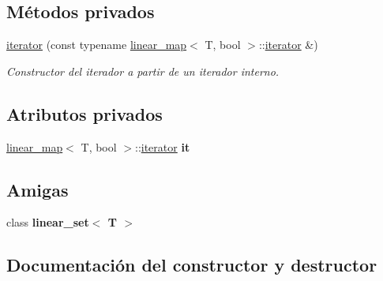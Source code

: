 \subsection*{Métodos privados}
\begin{DoxyCompactItemize}
\item 
\mbox{\label{classlinear__set_1_1iterator_a6778932b66a53ffd0efc46d26a0710c3}} 
\mbox{\hyperlink{classlinear__set_1_1iterator_a6778932b66a53ffd0efc46d26a0710c3}{iterator}} (const typename \mbox{\hyperlink{classlinear__map}{linear\+\_\+map}}$<$ T, bool $>$\+::\mbox{\hyperlink{classlinear__set_1_1iterator}{iterator}} \&)
\begin{DoxyCompactList}\small\item\em Constructor del iterador a partir de un iterador interno. \end{DoxyCompactList}\end{DoxyCompactItemize}
\subsection*{Atributos privados}
\begin{DoxyCompactItemize}
\item 
\mbox{\label{classlinear__set_1_1iterator_ae79df8b590ffcf8cd07a4751f859e882}} 
\mbox{\hyperlink{classlinear__map}{linear\+\_\+map}}$<$ T, bool $>$\+::\mbox{\hyperlink{classlinear__set_1_1iterator}{iterator}} {\bfseries it}
\end{DoxyCompactItemize}
\subsection*{Amigas}
\begin{DoxyCompactItemize}
\item 
\mbox{\label{classlinear__set_1_1iterator_a534ce5acb60190eb00d1f44365fa38b5}} 
class {\bfseries linear\+\_\+set$<$ T $>$}
\end{DoxyCompactItemize}


\subsection{Documentación del constructor y destructor}
\mbox{\label{classlinear__set_1_1iterator_ab60c745272218eee7323209f4f115fbd}} 
